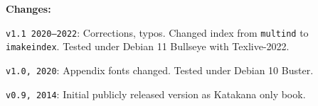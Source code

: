 \footnotesize

\textbf{Changes:}

\texttt{v1.1 2020--2022}: Corrections, typos. Changed index from
\texttt{multind} to \texttt{imakeindex}.  Tested under Debian 11 Bullseye with
Texlive-2022.

\texttt{v1.0, 2020}: Appendix fonts changed. Tested under Debian 10 Buster.

\texttt{v0.9, 2014}: Initial publicly released version as Katakana only book.


